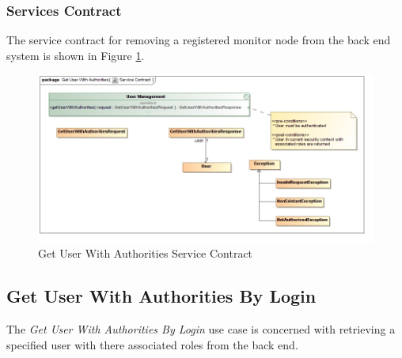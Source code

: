 \subsubsection{Services Contract}
The service contract for removing a registered monitor node from the back end 
system is shown in Figure \ref{fig:getUserWithAuthoritiesServicesContract}.
\begin{figure}[H]
	\begin{center}
		\includegraphics[scale=0.4]{../Diagrams and Charts/User Management/Get User With Authorities Service Contract.jpg}
		\caption{Get User With Authorities Service Contract}
		\label{fig:getUserWithAuthoritiesServicesContract}
	\end{center}
\end{figure}



\subsection{Get User With Authorities By Login}
The \textit{Get User With Authorities By Login} use case is concerned with
retrieving a specified user with there associated roles from the back end.

